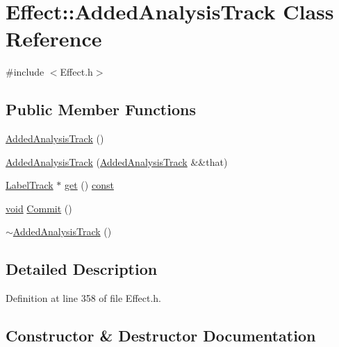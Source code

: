 \hypertarget{class_effect_1_1_added_analysis_track}{}\section{Effect\+:\+:Added\+Analysis\+Track Class Reference}
\label{class_effect_1_1_added_analysis_track}


{\ttfamily \#include $<$Effect.\+h$>$}

\subsection*{Public Member Functions}
\begin{DoxyCompactItemize}
\item 
\hyperlink{class_effect_1_1_added_analysis_track_aa9e4bea683f44859b882295c0f4d680b}{Added\+Analysis\+Track} ()
\item 
\hyperlink{class_effect_1_1_added_analysis_track_a44e5020a7061360098b722bd3ff0dafe}{Added\+Analysis\+Track} (\hyperlink{class_effect_1_1_added_analysis_track}{Added\+Analysis\+Track} \&\&that)
\item 
\hyperlink{class_label_track}{Label\+Track} $\ast$ \hyperlink{class_effect_1_1_added_analysis_track_a55a8318e137cd154f9dd0d712e55024e}{get} () \hyperlink{getopt1_8c_a2c212835823e3c54a8ab6d95c652660e}{const} 
\item 
\hyperlink{sound_8c_ae35f5844602719cf66324f4de2a658b3}{void} \hyperlink{class_effect_1_1_added_analysis_track_a260e7083db9e90a160670c5b78aad8f5}{Commit} ()
\item 
\hyperlink{class_effect_1_1_added_analysis_track_a01be09257102ca1174ec4a111042d24a}{$\sim$\+Added\+Analysis\+Track} ()
\end{DoxyCompactItemize}


\subsection{Detailed Description}


Definition at line 358 of file Effect.\+h.



\subsection{Constructor \& Destructor Documentation}

